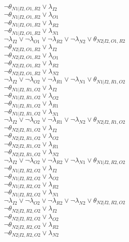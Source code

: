 $\neg\theta_{N1|I2,O1,R2} \vee \lambda_{I2}$\\
$\neg\theta_{N1|I2,O1,R2} \vee \lambda_{O1}$\\
$\neg\theta_{N1|I2,O1,R2} \vee \lambda_{R2}$\\
$\neg\theta_{N1|I2,O1,R2} \vee \lambda_{N1}$\\
$\neg\lambda_{I2} \vee \neg\lambda_{O1} \vee \neg\lambda_{R2} \vee \neg\lambda_{N2} \vee \theta_{N2|I2,O1,R2}$\\
$\neg\theta_{N2|I2,O1,R2} \vee \lambda_{I2}$\\
$\neg\theta_{N2|I2,O1,R2} \vee \lambda_{O1}$\\
$\neg\theta_{N2|I2,O1,R2} \vee \lambda_{R2}$\\
$\neg\theta_{N2|I2,O1,R2} \vee \lambda_{N2}$\\
$\neg\lambda_{I2} \vee \neg\lambda_{O2} \vee \neg\lambda_{R1} \vee \neg\lambda_{N1} \vee \theta_{N1|I2,R1,O2}$\\
$\neg\theta_{N1|I2,R1,O2} \vee \lambda_{I2}$\\
$\neg\theta_{N1|I2,R1,O2} \vee \lambda_{O2}$\\
$\neg\theta_{N1|I2,R1,O2} \vee \lambda_{R1}$\\
$\neg\theta_{N1|I2,R1,O2} \vee \lambda_{N1}$\\
$\neg\lambda_{I2} \vee \neg\lambda_{O2} \vee \neg\lambda_{R1} \vee \neg\lambda_{N2} \vee \theta_{N2|I2,R1,O2}$\\
$\neg\theta_{N2|I2,R1,O2} \vee \lambda_{I2}$\\
$\neg\theta_{N2|I2,R1,O2} \vee \lambda_{O2}$\\
$\neg\theta_{N2|I2,R1,O2} \vee \lambda_{R1}$\\
$\neg\theta_{N2|I2,R1,O2} \vee \lambda_{N2}$\\
$\neg\lambda_{I2} \vee \neg\lambda_{O2} \vee \neg\lambda_{R2} \vee \neg\lambda_{N1} \vee \theta_{N1|I2,R2,O2}$\\
$\neg\theta_{N1|I2,R2,O2} \vee \lambda_{I2}$\\
$\neg\theta_{N1|I2,R2,O2} \vee \lambda_{O2}$\\
$\neg\theta_{N1|I2,R2,O2} \vee \lambda_{R2}$\\
$\neg\theta_{N1|I2,R2,O2} \vee \lambda_{N1}$\\
$\neg\lambda_{I2} \vee \neg\lambda_{O2} \vee \neg\lambda_{R2} \vee \neg\lambda_{N2} \vee \theta_{N2|I2,R2,O2}$\\
$\neg\theta_{N2|I2,R2,O2} \vee \lambda_{I2}$\\
$\neg\theta_{N2|I2,R2,O2} \vee \lambda_{O2}$\\
$\neg\theta_{N2|I2,R2,O2} \vee \lambda_{R2}$\\
$\neg\theta_{N2|I2,R2,O2} \vee \lambda_{N2}$\\
